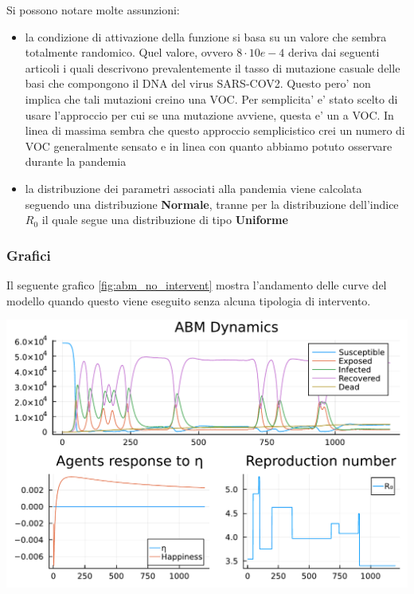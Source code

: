 Si possono notare molte assunzioni:
\begin{itemize}
	\item la condizione di attivazione della funzione si basa su un valore
	che sembra totalmente randomico. Quel valore, ovvero $8 \cdot 10e-4$ deriva dai
	seguenti articoli \cite{Markov2023} \cite{https://doi.org/10.1002/jmv.27331} \cite{Abavisani2022}
	i quali descrivono prevalentemente il tasso di mutazione casuale delle basi che compongono
	il DNA del virus SARS-COV2. Questo pero' non implica che tali mutazioni 
	creino una VOC. Per semplicita' e' stato scelto di usare l'approccio per cui
	se una mutazione avviene, questa e' un a VOC. In linea di massima sembra che 
	questo approccio semplicistico crei un numero di VOC generalmente sensato e 
	in linea con quanto abbiamo potuto osservare durante la pandemia
	\item la distribuzione dei parametri associati alla pandemia viene calcolata
	seguendo una distribuzione \textbf{Normale}, tranne per la distribuzione dell'indice $R_0$
	il quale segue una distribuzione di tipo \textbf{Uniforme} \cite{wiki:Numero_di_riproduzione_di_base}
\end{itemize}

\subsubsection*{Grafici}
Il seguente grafico \ref{fig:abm_no_intervent} mostra l'andamento delle curve del modello
quando questo viene eseguito senza alcuna tipologia di intervento. 

\begin{minipage}{\linewidth}
	\centering
	\includegraphics[width=\textwidth]{img/ABM SEIR NO INTERVENTION_2023-06-17.pdf}
	\label{fig:abm_no_intervent}
\end{minipage}

